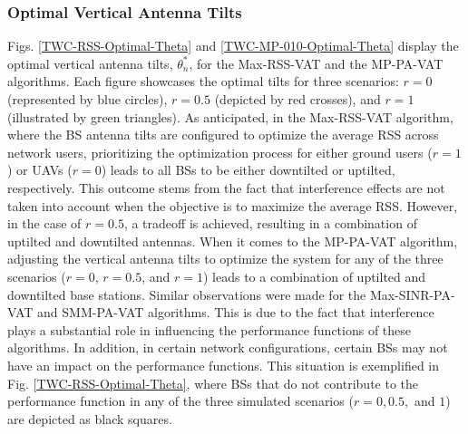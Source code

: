 \subsubsection{Optimal Vertical Antenna Tilts}
Figs. \ref{TWC-RSS-Optimal-Theta} and \ref{TWC-MP-010-Optimal-Theta} display the optimal vertical antenna tilts,  $\theta_n^*$, for the Max-RSS-VAT and the MP-PA-VAT algorithms. Each figure showcases the optimal tilts for three scenarios: $r = 0$ (represented by blue circles), $r = 0.5$ (depicted by red crosses), and $r = 1$ (illustrated by green triangles). 
As anticipated, in the Max-RSS-VAT algorithm, where the BS antenna tilts are configured to optimize the average RSS across network users, prioritizing the optimization process for either ground users ($r=1$) or UAVs ($r=0$) leads to all BSs to be either downtilted or uptilted, respectively. This outcome stems from the fact that interference effects are not taken into account when the objective is to maximize the average RSS. However, in the case of $r = 0.5$, a tradeoff is achieved, resulting in a combination of uptilted and downtilted antennas. 
When it comes to the MP-PA-VAT algorithm, adjusting the vertical antenna tilts to optimize the system for any of the three scenarios ($r = 0$, $r = 0.5$, and $r = 1$) leads to a combination of uptilted and downtilted base stations. Similar observations were made for the Max-SINR-PA-VAT and SMM-PA-VAT algorithms. This is due to the fact that interference plays a substantial role in influencing the performance functions of these algorithms. In addition, in certain network configurations, certain BSs may not have an impact on the performance functions. This situation is exemplified in Fig. \ref{TWC-RSS-Optimal-Theta}, where BSs that do not contribute to the performance function in any of the three simulated scenarios ($r = 0, 0.5,$ and $1$) are depicted as black squares. 



